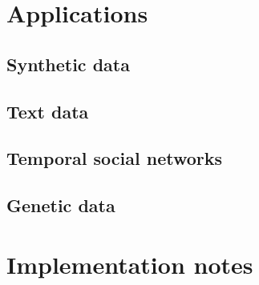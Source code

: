 \documentclass[11pt,a4paper]{article}
\begin{document}
\section{Applications} %

\subsection{Synthetic data}\label{sec:synth dat} %

\subsection{Text data}\label{sec:text dat} %

\subsection{Temporal social networks}\label{sec:templ soc netw} %

\subsection{Genetic data}\label{sec:genet dat} %

\section{Implementation notes} %
\end{document}
